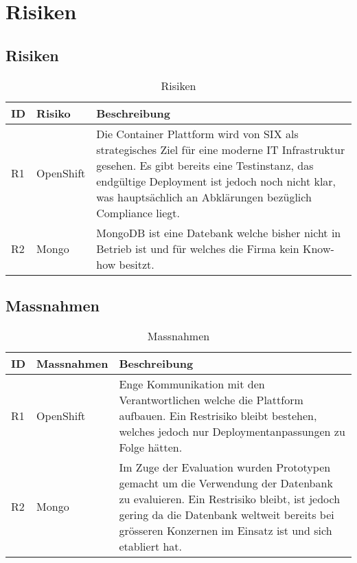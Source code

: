 \chapter{Risiken}

\section{Risiken}

\begin{table}[h!]
	\centering
	\caption{Risiken}
	\begin{tabular}{ | p{1cm} | p{3cm} | p{10cm} |}
		\toprule
		{\textbf{ID}} & {\textbf{Risiko}} & {\textbf{Beschreibung} } \\
		\midrule
		R1 & OpenShift & Die Container Plattform wird von SIX als strategisches Ziel für eine moderne IT Infrastruktur gesehen. Es gibt bereits eine Testinstanz, das endgültige Deployment ist jedoch noch nicht klar, was hauptsächlich an Abklärungen bezüglich Compliance liegt.  \\ \hline
		R2 & Mongo & MongoDB ist eine Datebank welche bisher nicht in Betrieb ist und für welches die Firma kein Know-how besitzt.\\
		\bottomrule
	\end{tabular}
\end{table}

\section{Massnahmen}
\begin{table}[h!]
	\centering
	\caption{Massnahmen}
	\begin{tabular}{ | p{1cm} | p{3cm} | p{10cm} | }
		\toprule
		{\textbf{ID}} & {\textbf{Massnahmen}} & {\textbf{Beschreibung}} \\
		\midrule
		R1 & OpenShift & Enge Kommunikation mit den Verantwortlichen welche die Plattform aufbauen. Ein Restrisiko bleibt bestehen, welches jedoch nur Deploymentanpassungen zu Folge hätten. \\ \hline
		R2 & Mongo & Im Zuge der Evaluation wurden Prototypen gemacht um die Verwendung der Datenbank zu evaluieren. Ein Restrisiko bleibt, ist jedoch gering da die Datenbank weltweit bereits bei grösseren Konzernen im Einsatz ist und sich etabliert hat. \\
		\bottomrule
	\end{tabular}
\end{table}
